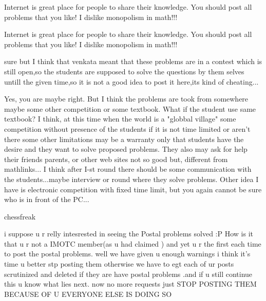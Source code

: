 \begin{mysolution}
	Internet is great place for people to share their knowledge. You should post all problems that you like! I dislike monopolism in math!!!
\end{mysolution}



\begin{mysolution}
	\begin{tcolorbox}Internet is great place for people to share their knowledge. You should post all problems that you like! I dislike monopolism in math!!!\end{tcolorbox}
sure but I think that venkata meant that these problems are in a contest which is still open,so the students are supposed to solve the questions by them selves untill the given time,so it is not a good idea to post it here,its kind of cheating...
\end{mysolution}



\begin{mysolution}
	Yes, you are maybe right. But I think the problems are took from somewhere maybe some other competition or some textbook. What if the student use same textbook? I think, at this time when the world is a "globbal village" some competition without presence of the students if it is not time limited or aren't there some other limitations may be a warranty only that students have the desire and they want to solve proposed problems. They also may ask for help their friends parents, or other web sites not so good but, different from mathlinks... I think after I-st round there should be some communication with the students...maybe interview or round where they solve problems. Other idea I have is electronic competition with fixed time limit, but you again cannot be sure who is in front of the PC...
\end{mysolution}



\begin{mysolution}
	\begin{bolded}chessfreak\end{bolded} i suppose u r relly intesrested in seeing the Postal problems solved  :P 
How is it that u r not a IMOTC member(as u had claimed   ) and yet u r the first each time to post the postal problems.
well we have given u enough warnings i think it's time u better stp posting them otherwise we have to egt each of ur posts scrutinized and deleted if they are have postal problems .and if u still continue this u know what lies next.
now no more requests just
STOP POSTING THEM BECAUSE OF U EVERYONE ELSE IS DOING SO 
\end{mysolution}



